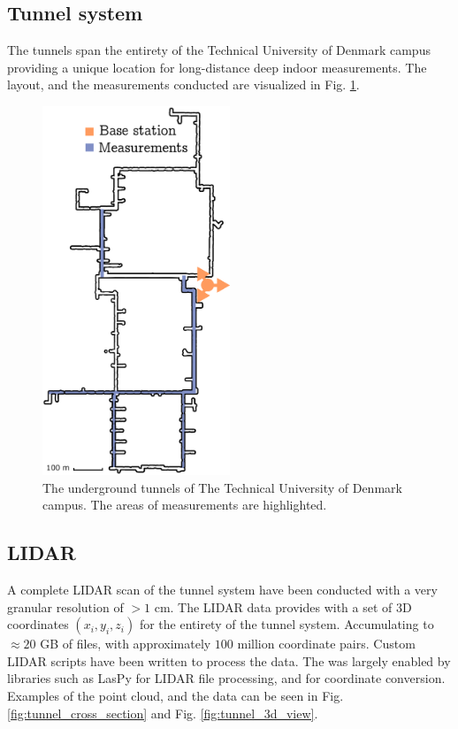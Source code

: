 \subsection{Tunnel system}
The tunnels span the entirety of the Technical University of Denmark campus providing a unique location for long-distance deep indoor measurements. The layout, and the measurements conducted are visualized in Fig. \ref{fig:underground_tunnel_system}.

\begin{figure}
    \centering
    \includegraphics[width=0.5\textwidth]{chapters/part_pathloss/figures/outdoor_to_indoor/Complete_tunnel_system.eps}
    \caption{The underground tunnels of The Technical University of Denmark campus. The areas of measurements are highlighted.}
    \label{fig:underground_tunnel_system}
\end{figure}



\subsection{LIDAR}
A complete LIDAR scan of the tunnel system have been conducted with a very granular resolution of $> 1$ cm. The LIDAR data provides with a set of $3$D coordinates $(x_i, y_i, z_i)$ for the entirety of the tunnel system. Accumulating to $\approx 20$ GB of files, with approximately $100$ million coordinate pairs. Custom LIDAR scripts have been written to process the data. The was largely enabled by libraries such as LasPy \cite{Grantbrown/laspy:1.0-1.4.} for LIDAR file processing, and \cite{alan_d_snow_2020_3714221} for coordinate conversion. Examples of the point cloud, and the data can be seen in Fig. \ref{fig:tunnel_cross_section} and Fig. \ref{fig:tunnel_3d_view}.

